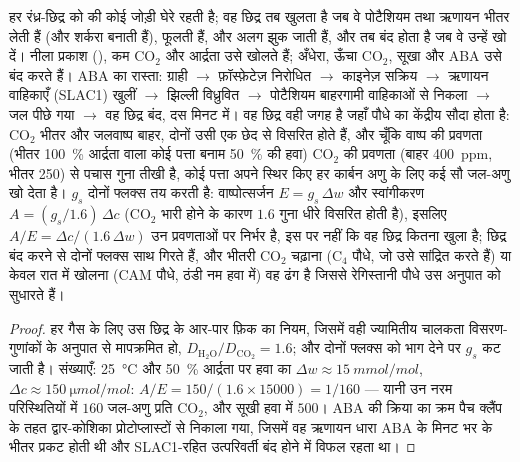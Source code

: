 \begin{proposition}[वाल्व के रूप में रंध्र]\label{prop:b3:plant-molecular-physiology:stomata}
हर रंध्र-छिद्र को \emph{} की कोई जोड़ी घेरे रहती है; वह
छिद्र तब खुलता है जब वे पोटैशियम तथा ऋणायन भीतर लेती हैं (और शर्करा
बनाती हैं), फूलती हैं, और अलग झुक जाती हैं, और तब बंद होता है जब वे
उन्हें खो दें। नीला प्रकाश (), कम CO$_{2}$ और आर्द्रता उसे
खोलते हैं; अँधेरा, ऊँचा CO$_{2}$, सूखा और ABA उसे बंद करते हैं। ABA का
रास्ता: ग्राही $\to$ फ़ॉस्फ़ेटेज़ निरोधित $\to$ काइनेज़ सक्रिय $\to$
ऋणायन वाहिकाएँ (SLAC1) खुलीं $\to$ झिल्ली विध्रुवित $\to$ पोटैशियम
बाहरगामी वाहिकाओं से निकला $\to$ जल पीछे गया $\to$ वह छिद्र बंद, दस
मिनट में। वह छिद्र वही जगह है जहाँ पौधे का केंद्रीय सौदा होता है:
CO$_{2}$ भीतर और जलवाष्प बाहर, दोनों उसी एक छेद से विसरित होते हैं, और
चूँकि वाष्प की प्रवणता (भीतर \qty{100}{\%} आर्द्रता वाला कोई पत्ता
बनाम \qty{50}{\%} की हवा) CO$_{2}$ की प्रवणता (बाहर \qty{400}{ppm},
भीतर \qty{250}{}) से पचास गुना तीखी है, कोई पत्ता अपने स्थिर किए हर
कार्बन अणु के लिए कई सौ जल-अणु खो देता है। \emph{}
$g_{s}$ दोनों फ्लक्स तय करती है: वाष्पोत्सर्जन $E = g_{s}\,\Delta w$ और
स्वांगीकरण $A = (g_{s}/1.6)\,\Delta c$ (CO$_{2}$ भारी होने के कारण
$1.6$ गुना धीरे विसरित होती है), इसलिए \emph{}
$A/E = \Delta c/(1.6\,\Delta w)$ उन प्रवणताओं पर निर्भर है, इस पर नहीं
कि वह छिद्र कितना खुला है; छिद्र बंद करने से दोनों फ्लक्स साथ गिरते
हैं, और भीतरी CO$_{2}$ चढ़ाना (C$_{4}$ पौधे, जो उसे सांद्रित करते हैं)
या केवल रात में खोलना (CAM पौधे, ठंडी नम हवा में) वह ढंग है जिससे
रेगिस्तानी पौधे उस अनुपात को सुधारते हैं।
\end{proposition}
\begin{proof}
हर गैस के लिए उस छिद्र के आर-पार फ़िक का नियम, जिसमें वही ज्यामितीय
चालकता विसरण-गुणांकों के अनुपात से मापक्रमित हो,
$D_{\mathrm{H_2O}}/D_{\mathrm{CO_2}} = 1.6$; और दोनों फ्लक्स को भाग
देने पर $g_{s}$ कट जाती है। संख्याएँ: \qty{25}{\celsius} और
\qty{50}{\%} आर्द्रता पर हवा का $\Delta w \approx \qty{15}{mmol/mol}$,
$\Delta c \approx
\qty{150}{\micro mol/mol}$: $A/E = 150/(1.6\times\num{15000}) = 1/160$
--- यानी उन नरम परिस्थितियों में $160$ जल-अणु प्रति CO$_{2}$, और सूखी
हवा में $500$। ABA की क्रिया का क्रम पैच क्लैंप के तहत द्वार-कोशिका
प्रोटोप्लास्टों से निकाला गया, जिसमें वह ऋणायन धारा ABA के मिनट भर के
भीतर प्रकट होती थी और SLAC1-रहित उत्परिवर्ती बंद होने में विफल रहता था।
\end{proof}

